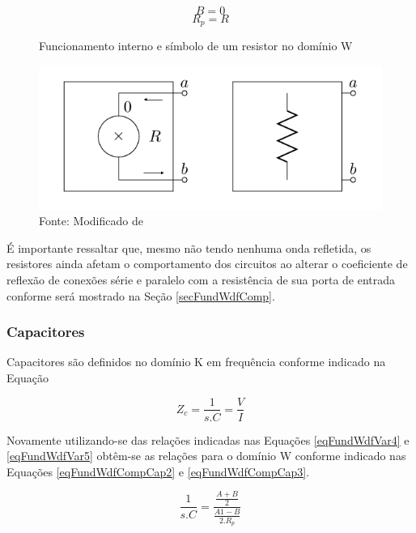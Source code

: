 	\begin{equation}
		\label{eqFundWdfCompRes5}
		B = 0
	\end{equation}   
	\begin{equation}
		\label{eqFundWdfCompRes6}
		R_p = R
	\end{equation}
	
	\begin{figure}[h]
		\label{figFundWdfCompRes1}
		\caption{Funcionamento interno e símbolo de um resistor no domínio W}
		\includegraphics[scale=0.5]{images/resistor}
		\centering
		\caption*{Fonte: Modificado de \cite{Bogason2017}}
	\end{figure}
	
	É importante ressaltar que, mesmo não tendo nenhuma onda refletida, os resistores ainda afetam o comportamento dos circuitos ao alterar o coeficiente de reflexão de conexões série e paralelo com a resistência de sua porta de entrada conforme será mostrado na Seção \ref{secFundWdfComp}.
	
		\subsubsection{Capacitores}
	
	Capacitores são definidos no domínio K em frequência conforme indicado na Equação
	
	\begin{equation}
		\label{eqFundWdfCompCap1}
		Z_c = \frac{1}{s.C} = \frac{V}{I}
	\end{equation}
	
	Novamente utilizando-se das relações indicadas nas Equações \ref{eqFundWdfVar4} e \ref{eqFundWdfVar5} obtêm-se as relações para o domínio W conforme indicado nas Equações \ref{eqFundWdfCompCap2} e \ref{eqFundWdfCompCap3}.
	
	\begin{equation}
		\label{eqFundWdfCompCap2}
		\frac{1}{s.C} = \frac{\frac{A+B}{2}}{\frac{A1-B}{2.R_p}}
	\end{equation}
	
